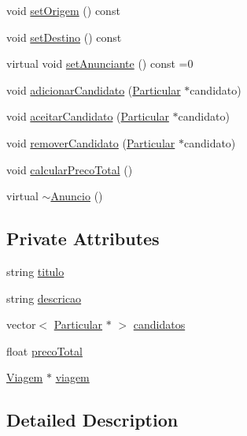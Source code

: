 \begin{DoxyCompactItemize}
void \hyperlink{class_anuncio_a5587a5b1ae085b424ca58a5d4d852f42}{set\+Origem} () const 
\item 
void \hyperlink{class_anuncio_a9cba8e726ac51128dd4b28cc7c2d5e47}{set\+Destino} () const 
\item 
virtual void \hyperlink{class_anuncio_ae1271413eb8f63fb054253057706de9a}{set\+Anunciante} () const =0
\item 
void \hyperlink{class_anuncio_a0c9937cd0d6f4748031e5aec7b61d496}{adicionar\+Candidato} (\hyperlink{class_particular}{Particular} $\ast$candidato)
\item 
void \hyperlink{class_anuncio_a3b7642bf06c1aa75dada38c7d015cb8d}{aceitar\+Candidato} (\hyperlink{class_particular}{Particular} $\ast$candidato)
\item 
void \hyperlink{class_anuncio_a755de86be5f1b66d66a6ddbe3f217246}{remover\+Candidato} (\hyperlink{class_particular}{Particular} $\ast$candidato)
\item 
void \hyperlink{class_anuncio_ac49d84d1a011803f9676f1e47c252125}{calcular\+Preco\+Total} ()
\item 
virtual \hyperlink{class_anuncio_acbc854230687f95adca2fdeaa377921b}{$\sim$\+Anuncio} ()
\end{DoxyCompactItemize}
\subsection*{Private Attributes}
\begin{DoxyCompactItemize}
\item 
string \hyperlink{class_anuncio_adb34bedd8220f42b9ee37662c21313e6}{titulo}
\item 
string \hyperlink{class_anuncio_aa6a9eb8d08cb06d16061b006eb2c8b97}{descricao}
\item 
vector$<$ \hyperlink{class_particular}{Particular} $\ast$ $>$ \hyperlink{class_anuncio_a387f6bd1b88720d5cf0b53462e5dc0aa}{candidatos}
\item 
float \hyperlink{class_anuncio_a8ba7cc797b8b582c596038a17e9bce3b}{preco\+Total}
\item 
\hyperlink{class_viagem}{Viagem} $\ast$ \hyperlink{class_anuncio_aa225374a19420f56f5abc258d96b691a}{viagem}
\end{DoxyCompactItemize}


\subsection{Detailed Description}



